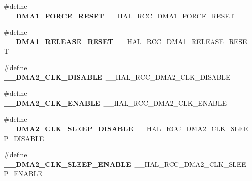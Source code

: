 \begin{DoxyCompactItemize}
\item 
\#define {\bfseries \+\_\+\+\_\+\+D\+M\+A1\+\_\+\+F\+O\+R\+C\+E\+\_\+\+R\+E\+S\+ET}~\+\_\+\+\_\+\+H\+A\+L\+\_\+\+R\+C\+C\+\_\+\+D\+M\+A1\+\_\+\+F\+O\+R\+C\+E\+\_\+\+R\+E\+S\+ET\hypertarget{group___h_a_l___r_c_c___aliased_ga1b49adf6ce960db1fc3e97c015904a4e}{}\label{group___h_a_l___r_c_c___aliased_ga1b49adf6ce960db1fc3e97c015904a4e}

\item 
\#define {\bfseries \+\_\+\+\_\+\+D\+M\+A1\+\_\+\+R\+E\+L\+E\+A\+S\+E\+\_\+\+R\+E\+S\+ET}~\+\_\+\+\_\+\+H\+A\+L\+\_\+\+R\+C\+C\+\_\+\+D\+M\+A1\+\_\+\+R\+E\+L\+E\+A\+S\+E\+\_\+\+R\+E\+S\+ET\hypertarget{group___h_a_l___r_c_c___aliased_ga30b3a917fca9f9ea9004c310ed3cefe6}{}\label{group___h_a_l___r_c_c___aliased_ga30b3a917fca9f9ea9004c310ed3cefe6}

\item 
\#define {\bfseries \+\_\+\+\_\+\+D\+M\+A2\+\_\+\+C\+L\+K\+\_\+\+D\+I\+S\+A\+B\+LE}~\+\_\+\+\_\+\+H\+A\+L\+\_\+\+R\+C\+C\+\_\+\+D\+M\+A2\+\_\+\+C\+L\+K\+\_\+\+D\+I\+S\+A\+B\+LE\hypertarget{group___h_a_l___r_c_c___aliased_ga3666b12e99818df90eca5d8c53376d0f}{}\label{group___h_a_l___r_c_c___aliased_ga3666b12e99818df90eca5d8c53376d0f}

\item 
\#define {\bfseries \+\_\+\+\_\+\+D\+M\+A2\+\_\+\+C\+L\+K\+\_\+\+E\+N\+A\+B\+LE}~\+\_\+\+\_\+\+H\+A\+L\+\_\+\+R\+C\+C\+\_\+\+D\+M\+A2\+\_\+\+C\+L\+K\+\_\+\+E\+N\+A\+B\+LE\hypertarget{group___h_a_l___r_c_c___aliased_gac2d5e13fd9b6bf9608a8fdba50558dce}{}\label{group___h_a_l___r_c_c___aliased_gac2d5e13fd9b6bf9608a8fdba50558dce}

\item 
\#define {\bfseries \+\_\+\+\_\+\+D\+M\+A2\+\_\+\+C\+L\+K\+\_\+\+S\+L\+E\+E\+P\+\_\+\+D\+I\+S\+A\+B\+LE}~\+\_\+\+\_\+\+H\+A\+L\+\_\+\+R\+C\+C\+\_\+\+D\+M\+A2\+\_\+\+C\+L\+K\+\_\+\+S\+L\+E\+E\+P\+\_\+\+D\+I\+S\+A\+B\+LE\hypertarget{group___h_a_l___r_c_c___aliased_ga6ac46665d831d56d75994809778459ce}{}\label{group___h_a_l___r_c_c___aliased_ga6ac46665d831d56d75994809778459ce}

\item 
\#define {\bfseries \+\_\+\+\_\+\+D\+M\+A2\+\_\+\+C\+L\+K\+\_\+\+S\+L\+E\+E\+P\+\_\+\+E\+N\+A\+B\+LE}~\+\_\+\+\_\+\+H\+A\+L\+\_\+\+R\+C\+C\+\_\+\+D\+M\+A2\+\_\+\+C\+L\+K\+\_\+\+S\+L\+E\+E\+P\+\_\+\+E\+N\+A\+B\+LE\hypertarget{group___h_a_l___r_c_c___aliased_gaf81a26ac7c46c241b8c8c38194bca9e2}{}\label{group___h_a_l___r_c_c___aliased_gaf81a26ac7c46c241b8c8c38194bca9e2}


\end{DoxyCompactItemize}
